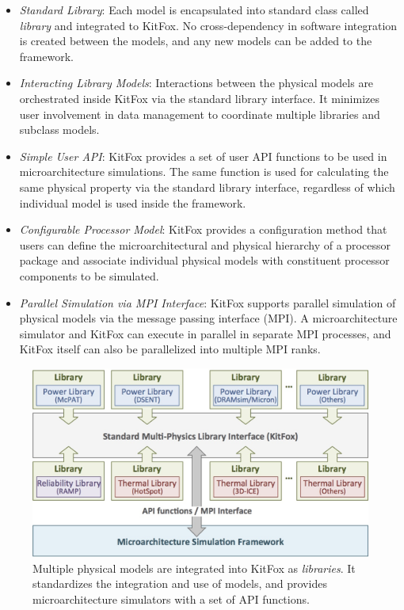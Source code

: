 \begin{itemize}
\item{\emph{Standard Library}: Each model is encapsulated into standard class called \emph{library} and integrated to KitFox. No cross-dependency in software integration is created between the models, and any new models can be added to the framework.} 
\item{\emph{Interacting Library Models}: Interactions between the physical models are orchestrated inside KitFox via the standard library interface. It minimizes user involvement in data management to coordinate multiple libraries and subclass models.} 
\item{\emph{Simple User API}: KitFox provides a set of user API functions to be used in microarchitecture simulations. The same function is used for calculating the same physical property via the standard library interface, regardless of which individual model is used inside the framework.}
\item{\emph{Configurable Processor Model}: KitFox provides a configuration method that users can define the microarchitectural and physical hierarchy of a processor package and associate individual physical models with constituent processor components to be simulated.} 
\item{\emph{Parallel Simulation via MPI Interface}: KitFox supports parallel simulation of physical models via the message passing interface (MPI). A microarchitecture simulator and KitFox can execute in parallel in separate MPI processes, and KitFox itself can also be parallelized into multiple MPI ranks.}
\end{itemize}

\begin{figure}[h]
\centering
\includegraphics[width=0.6 \textwidth]{figures/kitfox_concept.jpg}
\caption{Multiple physical models are integrated into KitFox as \emph{libraries}. It standardizes the integration and use of models, and provides microarchitecture simulators with a set of API functions.}
\label{fig:kitfox_concept}
\end{figure}

